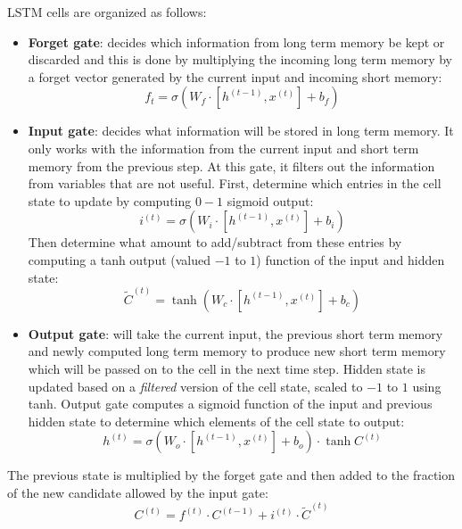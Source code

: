 LSTM cells are organized as follows:
\begin{itemize}
    \item \textbf{Forget gate}: decides which information from long term memory
          be kept or discarded and this is done by multiplying the incoming long
          term memory by a forget vector generated by the current input and
          incoming short memory:
          \begin{equation*}
              f_t = \sigma(W_f \cdot [h^{(t - 1)}, x^{(t)}] + b_f)
          \end{equation*}
    \item \textbf{Input gate}: decides what information will be stored in long
          term memory. It only works with the information from the current input
          and short term memory from the previous step. At this gate, it filters
          out the information from variables that are not useful. First, determine
          which entries in the cell state to update by computing $0 - 1$ sigmoid
          output:
          \begin{equation*}
              i^{(t)} = \sigma(W_i \cdot [h^{(t - 1)}, x^{(t)}] + b_i)
          \end{equation*}
          Then determine what amount to add/subtract from these entries by computing
          a tanh output (valued $-1$ to $1$) function of the input and hidden state:
          \begin{equation*}
              \tilde{C}^{(t)} = \tanh(W_c \cdot [h^{(t - 1)}, x^{(t)}] + b_c)
          \end{equation*}
    \item \textbf{Output gate}: will take the current input, the previous short
          term memory and newly computed long term memory to produce new short
          term memory which will be passed on to the cell in the next time step.
          Hidden state is updated based on a \textit{filtered} version of the
          cell state, scaled to $- 1$ to $1$ using tanh. Output gate computes a
          sigmoid function of the input and previous hidden state to determine
          which elements of the cell state to output:
          \begin{equation*}
              h^{(t)} = \sigma(W_o \cdot [h^{(t - 1)}, x^{(t)}] + b_o) \cdot \tanh C^{(t)}
          \end{equation*}
\end{itemize}

The previous state is multiplied by the forget gate and then added to the fraction
of the new candidate allowed by the input gate:
\begin{equation}
    C^{(t)} = f^{(t)} \cdot C^{(t - 1)} + i^{(t)} \cdot \tilde{C}^{(t)}
\end{equation}

